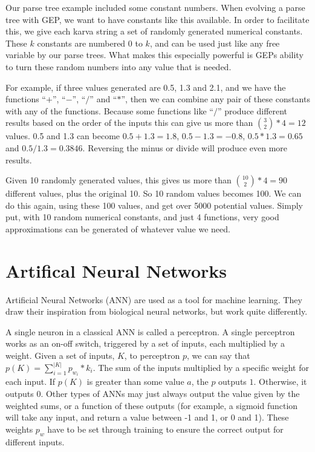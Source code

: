 \documentclass[a4paper,11pt]{report}
\begin{document}
Our parse tree example included some constant numbers. When evolving a parse tree with GEP, we want 
to have constants like this available. In order to facilitate this, we give each karva string a set 
of randomly generated numerical constants. These $k$ constants are numbered 0 to $k$, and can be 
used just like any free variable by our parse trees. What makes this especially powerful is GEPs 
ability to turn these random numbers into any value that is needed. 

For example, if three values generated are 0.5, 1.3 and 2.1, and we have the functions ``$+$'', ``$-$'', 
``$/$'' and ``$*$'', then we can combine any pair of these constants with any of the functions. 
Because some functions like ``$/$'' produce
different results based on the order of the inputs this 
can give us more than ${3 \choose 2} * 4 = 12$ values. 0.5 and 1.3 can become $0.5 + 1.3 = 1.8$, 
$0.5 - 1.3 = -0.8$, $0.5 * 1.3 = 0.65$ and $0.5 / 1.3 =  0.3846$. Reversing the minus or divide will 
produce even more results. 

Given 10 randomly generated values, this gives us more than 
${10 \choose 2} * 4 = 90$ different values, plus the original 10. So 10 random values becomes 100. 
We can do this again, using these 100 values, and get over 5000 potential values. Simply put, with 
10 random numerical constants, and just 4 functions, very good approximations can be generated 
of whatever value we need. 

\section{Artifical Neural Networks}

Artificial Neural Networks (ANN) are used as a tool for machine learning. They draw their inspiration 
from biological neural networks, but work quite differently.

A single neuron in a classical ANN is called a perceptron. A single perceptron works as an on-off switch, 
triggered by a set of inputs, each multiplied by a weight. Given a set of inputs, $K$, to perceptron $p$, we can 
say that $p(K) = \sum\limits_{i=1}^{|K|} p_{w_i} * k_i $. The sum of the inputs multiplied by a specific 
weight for each input. If $p(K)$ is greater than some value $a$, the $p$ outputs $1$. Otherwise, it outputs $0$. 
Other types of ANNs may just always output the value given by the weighted sums, or a function of these outputs 
(for example, a sigmoid function will take any input, and return a value between -1 and 1, or 0 and 1).
These weights $p_w$ have to be set through training to ensure the correct output for different inputs. 
\end{document}
